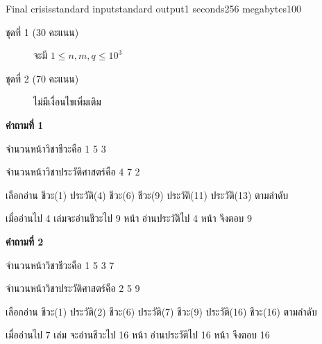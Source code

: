 \documentclass[11pt,a4paper]{article}
\begin{document}
\begin{problem}{Final crisis}{standard input}{standard output}{1 seconds}{256 megabytes}{100}
\begin{description}
 
\item[ชุดที่ 1 (30 คะแนน)] จะมี $ 1\leq n,m,q\leq10^3$
 
\item[ชุดที่ 2 (70 คะแนน)] ไม่มีเงื่อนไขเพิ่มเติม
 
\end{description}
 
\Examples
 
\begin{example}
%
\end{example}
 
\Note
\begin{note}
\textbf{คำถามที่ 1}
 
จำนวนหน้าวิชาชีวะคือ 1 5 3
 
จำนวนหน้าวิชาประวัติศาสตร์คือ 4 7 2
 
เลือกอ่าน ชีวะ(1) ประวัติ(4) ชีวะ(6) ชีวะ(9) ประวัติ(11) ประวัติ(13) ตามลำดับ
 
เมื่ออ่านไป 4 เล่มจะอ่านชีวะไป 9 หน้า อ่านประวัติไป 4 หน้า จึงตอบ 9
 
\textbf{คำถามที่ 2}
 
จำนวนหน้าวิชาชีวะคือ 1 5 3 7
 
จำนวนหน้าวิชาประวัติศาสตร์คือ 2 5 9
 
เลือกอ่าน ชีวะ(1) ประวัติ(2) ชีวะ(6) ประวัติ(7) ชีวะ(9) ประวัติ(16) ชีวะ(16) ตามลำดับ
 
เมื่ออ่านไป 7 เล่ม จะอ่านชีวะไป 16 หน้า อ่านประวัติไป 16 หน้า จึงตอบ 16
\end{note}
 
 
\end{problem}
 
\end{document}
